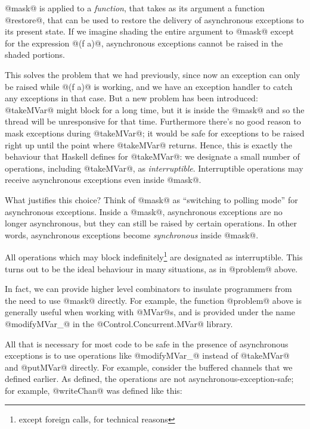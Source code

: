 
\noindent @mask@ is applied to a \emph{function}, that takes as its
argument a function @restore@, that can be used to restore the
delivery of asynchronous exceptions to its present state.  If we
imagine shading the entire argument to @mask@ except for the
expression @(f a)@, asynchronous exceptions cannot be raised in the
shaded portions.

This solves the problem that we had previously, since now an exception
can only be raised while @(f a)@ is working, and we have an exception
handler to catch any exceptions in that case.  But a new problem has
been introduced: @takeMVar@ might block for a long time, but it is
inside the @mask@ and so the thread will be unresponsive for that
time.  Furthermore there's no good reason to mask exceptions during
@takeMVar@; it would be safe for exceptions to be raised right up
until the point where @takeMVar@ returns.  Hence, this is exactly the
behaviour that Haskell defines for @takeMVar@: we designate a small
number of operations, including @takeMVar@, as \emph{interruptible}.
Interruptible operations may receive asynchronous exceptions even
inside @mask@.

What justifies this choice?  Think of @mask@ as ``switching to polling
mode'' for asynchronous exceptions.  Inside a @mask@, asynchronous
exceptions are no longer asynchronous, but they can still be raised by
certain operations.  In other words, asynchronous exceptions become
\emph{synchronous} inside @mask@.

All operations which may block indefinitely\footnote{except foreign
  calls, for technical reasons} are designated as interruptible.  This
turns out to be the ideal behaviour in many situations, as in
@problem@ above.

In fact, we can provide higher level combinators to insulate
programmers from the need to use @mask@ directly.  For example, the
function @problem@ above is generally useful when working with
@MVar@s, and is provided under the name @modifyMVar_@ in the
@Control.Concurrent.MVar@ library.


All that is necessary for most code to be safe in the presence of
asynchronous exceptions is to use operations like @modifyMVar_@
instead of @takeMVar@ and @putMVar@ directly.  For example, consider
the buffered channels that we defined earlier.  As defined, the
operations are not asynchronous-exception-safe; for example,
@writeChan@ was defined like this:

